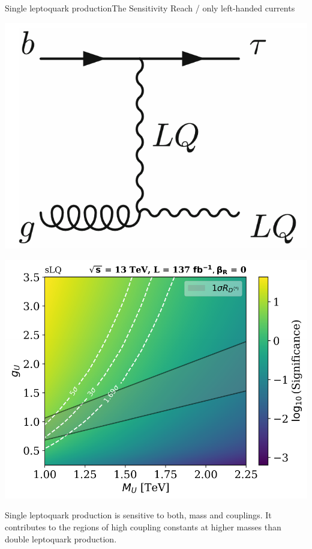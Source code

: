 \documentclass{bredelebeamer}
\begin{document}
\begin{frame}{Single leptoquark production}{The Sensitivity Reach / only left-handed currents}
	\begin{minipage}{.30\linewidth}
		\includegraphics[width=\linewidth]{single_LQ.png}
	\end{minipage}
	\begin{minipage}{.68\linewidth}
		\includegraphics[width=\linewidth]{Significance_Heatmap_13TeV_L137_sLQ_combined_woRHC.pdf}
	\end{minipage}
	{\large
		  Single leptoquark production is sensitive to both, mass and couplings. It contributes to the regions of high coupling constants at higher masses than double leptoquark production.
	}
\end{frame}
\end{document}
